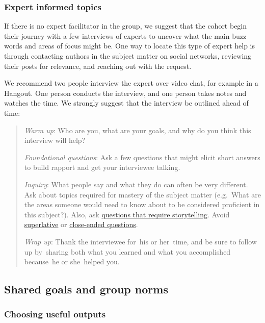 \subsubsection{Expert informed topics}

If there is no expert facilitator in the group, we suggest that the
cohort begin their journey with a few interviews of experts to uncover
what the main buzz words and areas of focus might be. One way to locate
this type of expert help is through contacting authors in the subject
matter on social networks, reviewing their posts for relevance, and
reaching out with the request.

We recommend two people interview the expert over video chat, for
example in a Hangout. One person conducts the interview, and one person
takes notes and watches the time. We strongly suggest that the interview
be outlined ahead of time:

\begin{quote}
\emph{Warm up}: Who are you, what are your goals, and why do you think
this interview will help?

\emph{Foundational questions}: Ask a few questions that might elicit
short answers to build rapport and get your interviewee talking.

\emph{Inquiry}: What people say and what they do can often be very
different. Ask about topics required for mastery of the subject matter
(e.g.~What are the areas someone would need to know about to be
considered proficient in this subject?). Also, ask
\href{http://en.wikipedia.org/wiki/Critical_Incident_Technique}{questions
that require storytelling}. Avoid
\href{http://en.wikipedia.org/wiki/Superlative}{superlative} or
\href{http://en.wikipedia.org/wiki/Closed-ended_question}{close-ended
questions}.

\emph{Wrap up}: Thank the interviewee for~his or her~time, and be sure
to follow up by~sharing both what you learned and what you accomplished
because~he or she~helped you.
\end{quote}

\subsection{Shared goals and group norms}

\subsubsection{Choosing useful outputs}

